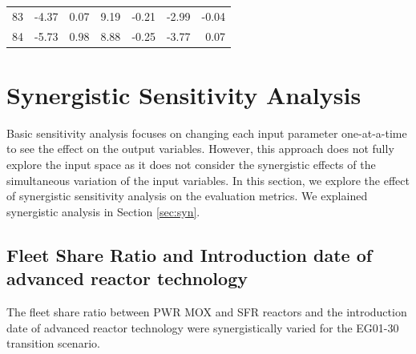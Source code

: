 \begin{table}[]
\begin{tabularx}{\textwidth}{R|RRRRRR}
            83  & -4.37            & 0.07                           & 9.19          & -0.21                       & -2.99             & -0.04                           \\
            84 & -5.73            & 0.98                           & 8.88          & -0.25                       & -3.77             & 0.07                           \\ \hline
           \end{tabularx}%

        \end{table}

\section{Synergistic Sensitivity Analysis}
\label{sec:synergistic}
Basic sensitivity analysis focuses on changing each input parameter 
one-at-a-time to see the effect on the output variables. 
However, this approach does not fully explore the input space as
it does not consider the synergistic effects of the simultaneous 
variation of the input variables.
In this section, we explore the effect of synergistic sensitivity 
analysis on the evaluation metrics.
We explained synergistic analysis in Section \ref{sec:syn}.

\subsection{Fleet Share Ratio and Introduction date of advanced 
reactor technology}
The fleet share ratio between PWR MOX and SFR 
reactors and the introduction date of advanced reactor 
technology were synergistically varied for 
the EG01-30 transition scenario. 

